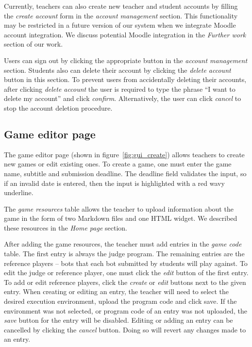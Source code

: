 Currently, teachers can also create new teacher and student accounts by filling the \emph{create account} form in the \emph{account management} section. This functionality may be restricted in a future version of our system when we integrate Moodle account integration. We discuss potential Moodle integration in the \emph{Further work} section of our work.

Users can sign out by clicking the appropriate button in the \emph{account management} section. Students also can delete their account by clicking the \emph{delete account} button in this section. To prevent users from accidentally deleting their accounts, after clicking \emph{delete account} the user is required to type the phrase ``I want to delete my account'' and click \emph{confirm}. Alternatively, the user can click \emph{cancel} to stop the account deletion procedure.

\subsection{Game editor page}

The game editor page (shown in figure~\ref{fig:gui_create}) allows teachers to create new games or edit existing ones. To create a game, one must enter the game name, subtitle and submission deadline. The deadline field validates the input, so if an invalid date is entered, then the input is highlighted with a red wavy underline.

The \emph{game resources} table allows the teacher to upload information about the game in the form of two Markdown files and one HTML widget. We described these resources in the \emph{Home page} section.

After adding the game resources, the teacher must add entries in the \emph{game code} table. The first entry is always the judge program. The remaining entries are the reference players -- bots that each bot submitted by students will play against. To edit the judge or reference player, one must click the \emph{edit} button of the first entry. To add or edit reference players, click the \emph{create} or \emph{edit} buttons next to the given entry. When creating or editing an entry, the teacher will need to select the desired execution environment, upload the program code and click save. If the environment was not selected, or program code of an entry was not uploaded, the \emph{save} button for the entry will be disabled. Editing or adding an entry can be cancelled by clicking the \emph{cancel} button. Doing so will revert any changes made to an entry.

